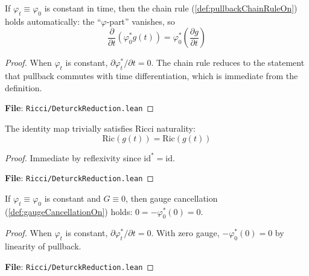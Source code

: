 \begin{lemma}
\label{lem:pullbackChainRuleOn_constφ}
\leanok
{}
If $\varphi_t \equiv \varphi_0$ is constant in time, then the chain rule (\ref{def:pullbackChainRuleOn}) holds automatically: the ``$\varphi$-part'' vanishes, so
\[ \frac{\partial}{\partial t}(\varphi_0^* g(t)) = \varphi_0^*\left(\frac{\partial g}{\partial t}\right) \]
\end{lemma}

\begin{proof}
\leanok
{}
When $\varphi_t$ is constant, $\partial \varphi_t^*/\partial t = 0$. The chain rule reduces to the statement that pullback commutes with time differentiation, which is immediate from the definition.

\textbf{File}: \texttt{Ricci/DeturckReduction.lean}
\end{proof}

\begin{lemma}
\label{lem:ricciNaturalityOn_id}
\leanok
{}
The identity map trivially satisfies Ricci naturality:
\[ \mathrm{Ric}(g(t)) = \mathrm{Ric}(g(t)) \]
\end{lemma}

\begin{proof}
\leanok
{}
Immediate by reflexivity since $\mathrm{id}^* = \mathrm{id}$.

\textbf{File}: \texttt{Ricci/DeturckReduction.lean}
\end{proof}

\begin{lemma}
\label{lem:gaugeCancellationOn_zero_constφ}
\leanok
{}
If $\varphi_t \equiv \varphi_0$ is constant and $G \equiv 0$, then gauge cancellation (\ref{def:gaugeCancellationOn}) holds: $0 = -\varphi_0^*(0) = 0$.
\end{lemma}

\begin{proof}
\leanok
{}
When $\varphi_t$ is constant, $\partial \varphi_t^*/\partial t = 0$. With zero gauge, $-\varphi_0^*(0) = 0$ by linearity of pullback.

\textbf{File}: \texttt{Ricci/DeturckReduction.lean}
\end{proof}

